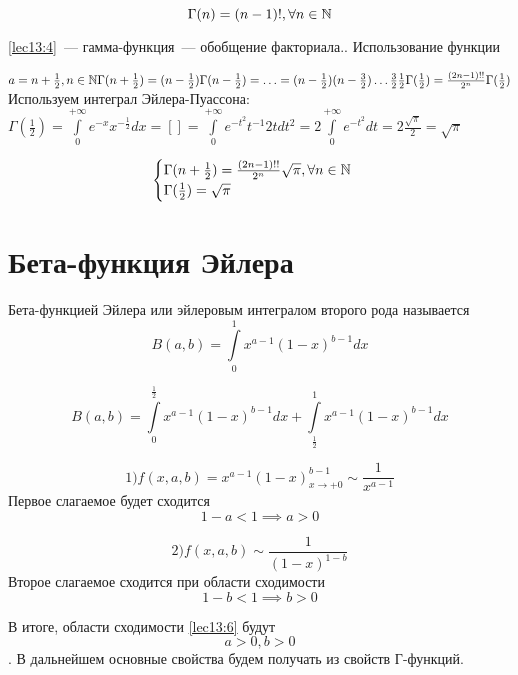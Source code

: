 \documentclass[../../main.tex]{subfiles}
\begin{document}
\begin{equation}
\label{lec13:4}
\Gamma(n) = (n-1)!,  \forall n \in \mathbb{N}
\end{equation}

\eqref{lec13:4}~--- гамма-функция~--- обобщение факториала.. 
Использование функции

$
a = n + \frac{1}{2}, n \in \mathbb{N}
\\
\Gamma(n + \frac{1}{2}) = (n - \frac{1}{2})\Gamma(n-\frac{1}{2})=\ldots=
(n-\frac{1}{2})(n-\frac{3}{2})\ldots\frac{3}{2}\frac{1}{2}\Gamma(\frac{1}{2}) 
= 
\frac{(2n-1)!!}{2^n}\Gamma(\frac{1}{2})
$
Используем интеграл Эйлера-Пуассона:
\\
$
\Gamma(\frac{1}{2})= \int\limits_0^{+\infty} e^{-x} x^{-\frac{1}{2}} dx = [] = 
\int\limits_0^{+\infty} e^{-t^2} t^{-1} 2t dt^2 = 2 \int\limits_0^{+\infty} 
e^{-t^2} dt 
= 2 \frac{\sqrt{\pi}}{2} = \sqrt{\pi}
$

\begin{equation}
	\label{lec13:5}
	\begin{cases}
		\Gamma(n+\frac{1}{2}) = \frac{(2n-1)!!}{2^n} \sqrt{\pi}, \forall n \in \mathbb{N} \\
		\Gamma(\frac{1}{2}) = \sqrt{\pi}
	\end{cases}
\end{equation}

\section{Бета-функция Эйлера}
Бета-функцией Эйлера или эйлеровым интегралом второго рода называется
\begin{equation}
	\label{lec13:6}
	B(a, b) = \int\limits_0^1x^{a-1}(1-x)^{b-1}dx
\end{equation}

\begin{equation}
	\label{lec13:7}
	B(a, b) = \int\limits_0^{\frac{1}{2}} 
	x^{a-1} (1-x)^{b-1}dx + \int\limits_{\frac{1}{2}}^{1} 
	x^{a-1}(1-x)^{b-1}dx
\end{equation}


\[1) f(x, a, b) = x^{a-1}(1-x)^{b-1}_{x\to+0} \sim \dfrac{1}{x^{a-1}}\]
Первое слагаемое будет сходится \[ 1 - a < 1 \implies a > 0 \]

\begin{equation}
	2) f(x, a, b) \sim \dfrac{1}{(1-x)^{1-b}}
\end{equation}
Второе слагаемое сходится при области сходимости \[ 1-b < 1 \implies b > 0 \]

В итоге, области сходимости \eqref{lec13:6} будут \[a > 0, b > 0\].
В дальнейшем основные свойства будем получать из свойств Г-функций.
\end{document}

